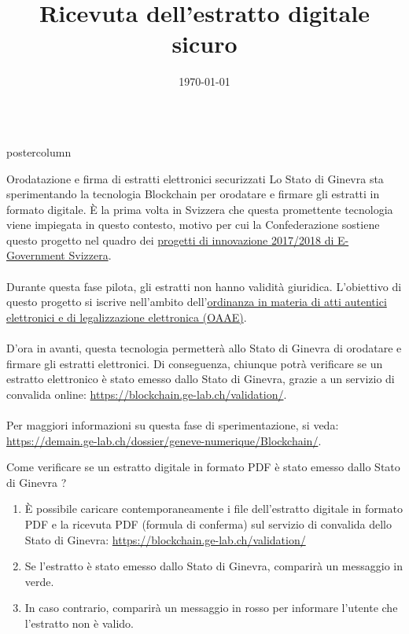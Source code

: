 \documentclass[roundedcorners=true, titleposition=center]{beamerthemeruhuisstijlposter}
\title{Ricevuta dell’estratto digitale sicuro}
\date{\today}
\begin{document}
\begin{frame}
\begin{columns}
\begin{column}{0.95\textwidth}
\begin{beamercolorbox}[center, wd=\textwidth]{postercolumn}
\begin{minipage}[T]{0.95\textwidth}
\parbox[t][\columnheight]{\textwidth}{%
\begin{block}{Orodatazione e firma di estratti elettronici securizzati}
Lo Stato di Ginevra sta sperimentando la tecnologia Blockchain per orodatare e firmare gli estratti in formato digitale. È la prima volta in Svizzera che questa promettente tecnologia viene impiegata in questo contesto, motivo per cui la Confederazione sostiene questo progetto nel quadro dei \href{https://www.egovernment.ch/fr/umsetzung/innovationen/innovations-20172018/}{progetti di innovazione 2017/2018 di E-Government Svizzera}.
\\
\\
Durante questa fase pilota, gli estratti non hanno validità giuridica. L’obiettivo di questo progetto si iscrive nell’ambito dell’\href{https://www.admin.ch/opc/fr/classified-compilation/20111505/201701010000/943.033.pdf}{ordinanza in materia di atti autentici elettronici e di legalizzazione elettronica (OAAE)}.
\\
\\
D’ora in avanti, questa tecnologia permetterà allo Stato di Ginevra di orodatare e firmare gli estratti elettronici. Di conseguenza, chiunque potrà verificare se un estratto elettronico è stato emesso dallo Stato di Ginevra, grazie a un servizio di convalida online: \href{https://blockchain.ge-lab.ch/validation/}{https://blockchain.ge-lab.ch/validation/}.
\\
\\
Per maggiori informazioni su questa fase di sperimentazione, si veda: \href{https://demain.ge-lab.ch/dossier/geneve-numerique/Blockchain/}{https://demain.ge-lab.ch/dossier/geneve-numerique/Blockchain/}.
\end{block}
\medskip
\begin{block}{Come verificare se un estratto digitale in formato PDF è stato emesso dallo Stato di Ginevra ?}
\begin{enumerate}
\item È possibile caricare contemporaneamente i file dell’estratto digitale in formato PDF e la ricevuta PDF (formula di conferma) sul servizio di convalida dello Stato di Ginevra: \href{https://blockchain.ge-lab.ch/validation/}{https://blockchain.ge-lab.ch/validation/}
\item Se l’estratto è stato emesso dallo Stato di Ginevra, comparirà un messaggio in verde.
\item In caso contrario, comparirà un messaggio in rosso per informare l’utente che l’estratto non è valido.
\end{enumerate}
\end{block}
}
\end{minipage}
\end{beamercolorbox}
\end{column}
\end{columns}
\end{frame}
\end{document}
